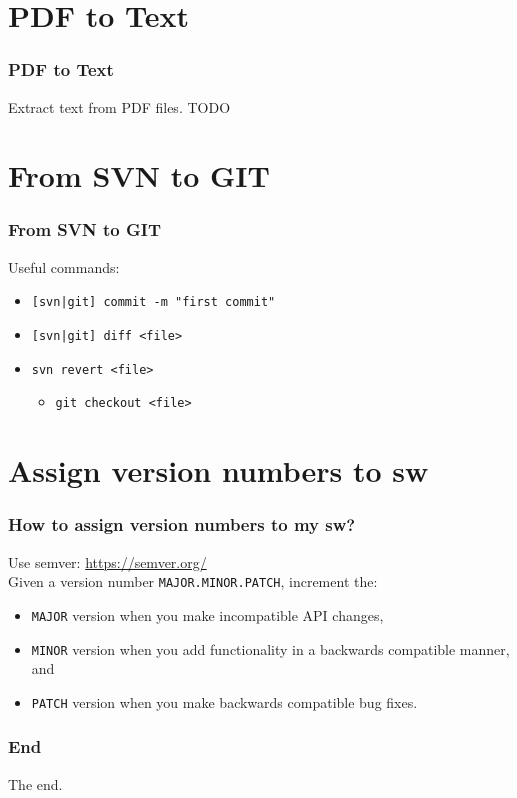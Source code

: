 \documentclass[pdf]{beamer}
\newcommand{\mono}[1]{\texttt{#1}}
\begin{document}
\section{PDF to Text}
\begin{frame}
  \frametitle{PDF to Text}
  Extract text from PDF files.
  TODO
\end{frame}


\section{From SVN to GIT}
\begin{frame}
  \frametitle{From SVN to GIT}
  Useful commands:
  \begin{itemize}
    \item \mono{[svn|git] commit -m "first commit"}
    \item \mono{[svn|git] diff <file>}
    
    \item \mono{svn revert <file>}
      \begin{itemize}
      \item \mono{git checkout <file>}
      \end{itemize}
  \end{itemize}
\end{frame}


\section{Assign version numbers to sw}
\begin{frame}
  \frametitle{How to assign version numbers to my sw?}
  Use semver: \url{https://semver.org/}\\
  Given a version number \mono{MAJOR.MINOR.PATCH}, increment the:
  \begin{itemize}
    \item \mono{MAJOR} version when you make incompatible API changes,
    \item \mono{MINOR} version when you add functionality in a backwards compatible manner, and
    \item \mono{PATCH} version when you make backwards compatible bug fixes.
  \end{itemize}
\end{frame}
















\begin{frame}
  \frametitle{End}
  The end.
\end{frame}
\end{document}
